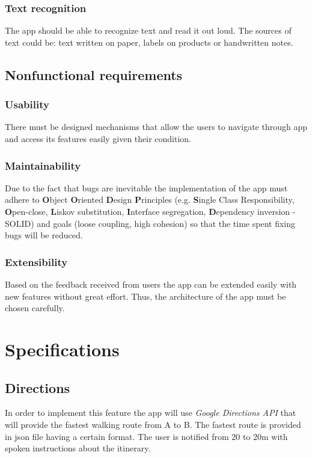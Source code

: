 \documentclass{article}[11]
\begin{document}
\subsubsection{Text recognition}
	The app should be able to recognize text and read it out loud. The sources of text could be: text written on paper, labels on products or handwritten notes.
	
	
\subsection{Nonfunctional requirements}

\subsubsection{Usability}
	There must be designed mechanisms that allow the users to navigate through app and access its features easily given their condition.

\subsubsection{Maintainability}
	Due to the fact that bugs are inevitable the implementation of the app must adhere to \textbf{O}bject \textbf{O}riented \textbf{D}esign \textbf{P}rinciples (e.g. \textbf{S}ingle Class Responsibility, \textbf{O}pen-close, \textbf{L}iskov substitution, \textbf{I}nterface segregation, \textbf{D}ependency inversion - SOLID) and goals (loose coupling, high cohesion) so that the time spent fixing bugs will be reduced. 


\subsubsection{Extensibility}
	Based on the feedback received from users the app can be extended easily with new features without great effort. Thus, the architecture of the app must be chosen carefully.


\section{Specifications}

\subsection{Directions}
	In order to implement this feature the app will use \emph{Google Directions API} that will provide the fastest walking route from A to B. The fastest route is provided in json file having a certain format. The user is notified from 20 to 20m with spoken instructions about the itinerary.
\end{document}
